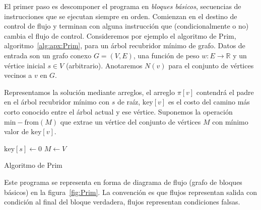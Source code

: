   El primer paso es descomponer el programa en \emph{bloques básicos},
  secuencias de instrucciones que se ejecutan siempre en orden.
  Comienzan en el destino de control de flujo
  y terminan con alguna instrucción que
  (condicionalmente o no)
  cambia el flujo de control.
  Consideremos por ejemplo el algoritmo de Prim,
  algoritmo~\ref{alg:apx:Prim},
  para un árbol recubridor mínimo de grafo.
  Datos de entrada son un grafo conexo \(G = (V, E)\),
  una función de peso \(w \colon E \to \mathbb{R}\)
  y un vértice inicial \(s \in V\)
  (arbitrario).
  Anotaremos \(N(v)\) para el conjunto de vértices vecinos a \(v\) en \(G\).

  Representamos la solución mediante arreglos,
  el arreglo \(\pi[v]\) contendrá el padre en el árbol recubridor mínimo
  con \(s\) de raíz,
  \(\mathrm{key}[v]\) es el costo del camino más corto conocido
  entre el árbol actual y ese vértice.
  Suponemos la operación \(\mathrm{min-from}(M)\)
  que extrae un vértice del conjunto de vértices \(M\)
  con mínimo valor de \(\mathrm{key}[v]\).
  \begin{algorithm}[ht]
    \DontPrintSemicolon\Indp

    \(\mathrm{key}[s] \gets 0\) \;
    \(M \gets V\) \;
    \caption{Algoritmo de Prim}
    \label{alg:apx:Prim}
  \end{algorithm}
  Este programa se representa en forma de diagrama de flujo
  (grafo de bloques básicos)
  en la figura~\ref{fig:Prim}.
  La convención es que flujos 
  representan salida con condición al final del bloque verdadera,
  flujos  representan condiciones falsas.
